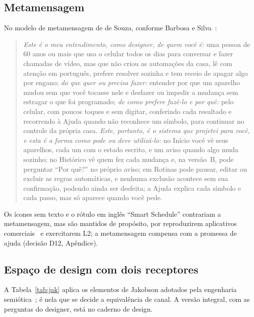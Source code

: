 \documentclass[conference]{IEEEtran}
\begin{document}
\subsection{Metamensagem}
No modelo de metamensagem de de Souza, conforme Barbosa e Silva~\cite[p.~77]{barbosa2010}:
\begin{quote}\footnotesize
\textit{Este é o meu entendimento, como designer, de quem você é:} uma pessoa de 60 anos ou mais que usa o celular todos os dias para conversar e fazer chamadas de vídeo, mas que não criou as automações da casa, lê com atenção em português, prefere resolver sozinha e tem receio de apagar algo por engano; \textit{do que quer ou precisa fazer:} entender por que um aparelho mudou sem que você tocasse nele e desfazer ou impedir a mudança sem estragar o que foi programado; \textit{de como prefere fazê-lo e por quê:} pelo celular, com poucos toques e sem digitar, conferindo cada resultado e recorrendo à Ajuda quando não reconhece um símbolo, para continuar no controle da própria casa. \textit{Este, portanto, é o sistema que projetei para você, e esta é a forma como pode ou deve utilizá-lo:} no Início você vê seus aparelhos, cada um com o estado escrito, e um aviso quando algo muda sozinho; no Histórico vê quem fez cada mudança e, na versão~B, pode perguntar ``Por quê?'' no próprio aviso; em Rotinas pode pausar, editar ou excluir as regras automáticas, e nenhuma exclusão acontece sem sua confirmação, podendo ainda ser desfeita; a Ajuda explica cada símbolo e cada passo, mas só aparece quando você pede.
\end{quote}
Os ícones sem texto e o rótulo em inglês ``Smart Schedule'' contrariam a metamensagem, mas são mantidos de propósito, por reproduzirem aplicativos comerciais~\cite[pp.~34--35]{tsuchiya2018} e exercitarem L2; a metamensagem compensa com a promessa de ajuda (decisão D12, Apêndice).

\subsection{Espaço de design com dois receptores}
A Tabela~\ref{tab:jak} aplica os elementos de Jakobson adotados pela engenharia semiótica~\cite{barbosa2010}; é nela que se decide a equivalência de canal. A versão integral, com as perguntas do designer, está no caderno de design.

\begin{table}[!t]
\caption{Espaço de design com dois receptores}
\label{tab:jak}
\centering

\end{table}
\end{document}
